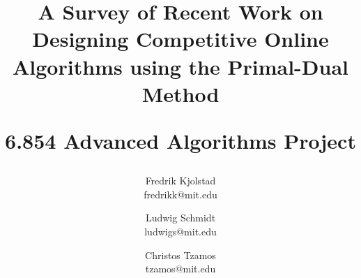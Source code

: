 \title{A Survey of Recent Work on Designing Competitive Online Algorithms using the Primal-Dual Method \\ \begin{large}6.854 Advanced Algorithms Project\end{large}}

\author{Fredrik Kjolstad \\ fredrikk@mit.edu \and Ludwig Schmidt \\ ludwigs@mit.edu \and Christos Tzamos \\ tzamos@mit.edu}
\date{}

\documentclass[10pt, twocolumn]{article}

\usepackage{amsmath}
\usepackage{amsthm}
\usepackage{url}
\usepackage{relsize}
\usepackage{xspace}
\usepackage{subfigure}
\usepackage{graphicx,color}
\usepackage[noend]{algorithmic}
\usepackage{algorithm}
\renewcommand{\algorithmicrequire}{\textbf{Input:}}
\renewcommand{\algorithmicensure}{\textbf{Output:}}


\usepackage{fullpage}

\newcommand{\fred}[1]{%
	\textcolor{red}{[#1]}
}
\newcommand{\christos}[1]{%
	\textcolor{red}{[#1]}
}
\newcommand{\ludwig}[1]{%
	\textcolor{red}{[#1]}
}

\newtheorem{theorem}{Theorem}[section]
\newtheorem{lemma}[theorem]{Lemma}


\maketitle

\begin{abstract}
Online algorithms have become increasingly popular in the last few decades.
An important reason for this is that they capture the uncertainty we face in many important domains, ranging from computational finance to internet security and catastrophe management.
The primal-dual method is an approach that has been gaining popularity as a technique to arrive at approximations for NP-hard problems.
More recently it has also been applied as a general framework to solve many online algorithms.
In 2009, Buchbinder and Naor published a survey of applications of the primal-dual method to online algorithms.
Since then new complex online problems have been tackled using this technique, such as the online node-weighted steiner tree problem, the k-server problem and online job-migration.
We present a survey of recent applications of the primal-dual method to online problems.
\end{abstract}

